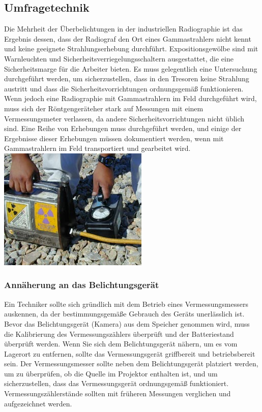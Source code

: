 {\begin{enumerate}
\end{enumerate}
\subsection{Umfragetechnik}
Die Mehrheit der Überbelichtungen in der industriellen Radiographie ist das Ergebnis dessen, dass der Radiograf den Ort eines Gammastrahlers nicht kennt und keine geeignete Strahlungserhebung durchführt.
Expositionsgewölbe sind mit Warnleuchten und Sicherheitsverriegelungsschaltern ausgestattet, die eine Sicherheitsmarge für die Arbeiter bieten. Es muss gelegentlich eine Untersuchung durchgeführt werden, um sicherzustellen, dass in den Tresoren keine Strahlung austritt und dass die Sicherheitsvorrichtungen ordnungsgemäß funktionieren. Wenn jedoch eine Radiographie mit Gammastrahlern im Feld durchgeführt wird, muss sich der Röntgengeräteher stark auf Messungen mit einem Vermessungsmeter verlassen, da andere Sicherheitsvorrichtungen nicht üblich sind. Eine Reihe von Erhebungen muss durchgeführt werden, und einige der Ergebnisse dieser Erhebungen müssen dokumentiert werden, wenn mit Gammastrahlern im Feld transportiert und gearbeitet wird.
\includegraphics[scale=0.9]{img/cameraTest.jpg}\\
\subsubsection{Annäherung an das Belichtungsgerät}
Ein Techniker sollte sich gründlich mit dem Betrieb eines Vermessungsmessers auskennen, da der bestimmungsgemäße Gebrauch des Geräts unerlässlich ist. Bevor das Belichtungsgerät (Kamera) aus dem Speicher genommen wird, muss die Kalibrierung des Vermessungszählers überprüft und der Batteriestand überprüft werden. Wenn Sie sich dem Belichtungsgerät nähern, um es vom Lagerort zu entfernen, sollte das Vermessungsgerät griffbereit und betriebsbereit sein. Der Vermessungsmesser sollte neben dem Belichtungsgerät platziert werden, um zu überprüfen, ob die Quelle im Projektor enthalten ist, und um sicherzustellen, dass das Vermessungsgerät ordnungsgemäß funktioniert. Vermessungszählerstände sollten mit früheren Messungen verglichen und aufgezeichnet werden.
}
